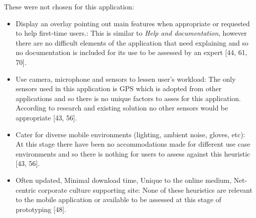 \documentclass[a4 paper, 12pt]{article}
\begin{document}
    These were not chosen for this application:
        \begin{itemize}
            \item \textcolor{mygreen}{Display an overlay pointing out main features when appropriate or requested to help first-time users.:} This is similar to \textit{\textcolor{myblue}{Help and documentation}}, however there are no difficult elements of the application that need explaining and so no documentation is included for its use to be assessed by an expert [44, 61, 70].
            \item \textcolor{mygreen}{Use camera, microphone and sensors to lessen user’s  workload:} The only sensors used in this application is GPS which is adopted from other applications and so there is no unique factors to asses for this application. According to research and existing solution no other sensors would be appropriate [43, 56]. 
            \item \textcolor{mygreen}{Cater for diverse mobile environments (lighting, ambient noise, gloves, etc):} At this stage there have been no accommodations made for different use case environments and so there is nothing for users to assess against this heuristic [43, 56]. 
            \item \textcolor{myorange}{Often updated, Minimal download time, Unique to the online medium, Net-centric corporate culture supporting site:} None of these heuristics are relevant to the mobile application or available to be assessed at this stage of prototyping [48].            
        \end{itemize}
\end{document}
